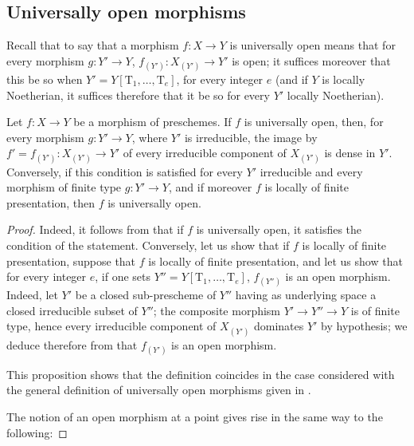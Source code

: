 
\subsection{Universally open morphisms}
\label{subsection:IV.14.3}

\begin{env}[14.3.1]
\label{IV.14.3.1}
Recall  that to say that a morphism $f:X\to Y$ is universally open means that for every morphism $g:Y'\to Y$, $f_{(Y')}:X_{(Y')}\to Y'$ is open; it suffices moreover that this be so when $Y'=Y[\mathrm{T}_1,\ldots,\mathrm{T}_e]$, for every integer $e$  (and if $Y$ is locally Noetherian, it suffices therefore that it be so for every $Y'$ locally Noetherian).
\end{env}

\begin{proposition}[14.3.2]
\label{IV.14.3.2}
Let $f:X\to Y$ be a morphism of preschemes.
If $f$ is universally open, then, for every morphism $g:Y'\to Y$, where $Y'$ is irreducible, the image by $f'=f_{(Y')}:X_{(Y')}\to Y'$ of every irreducible component of $X_{(Y')}$ is dense in $Y'$.
Conversely, if this condition is satisfied for every $Y'$ irreducible and every morphism of finite type $g:Y'\to Y$, and if moreover $f$ is locally of finite presentation, then $f$ is universally open.
\end{proposition}

\begin{proof}
Indeed, it follows from  that if $f$ is universally open, it satisfies the condition of the statement.
Conversely, let us show that if $f$ is locally of finite presentation, suppose that $f$ is locally of finite presentation, and let us show that for every integer $e$, if one sets $Y''=Y[\mathrm{T}_1,\ldots,\mathrm{T}_e]$, $f_{(Y'')}$ is an open morphism.
Indeed, let $Y'$ be a closed sub-prescheme of $Y''$ having as underlying space a closed irreducible subset of $Y''$; the composite morphism $Y'\to Y''\to Y$ is of finite type, hence every irreducible component of $X_{(Y')}$ dominates $Y'$ by hypothesis; we deduce therefore from  that $f_{(Y')}$ is an open morphism.

This proposition shows that the definition  coincides in the case considered with the general definition of universally open morphisms given in .

The notion of an open morphism at a point  gives rise in the same way to the following:
\end{proof}


